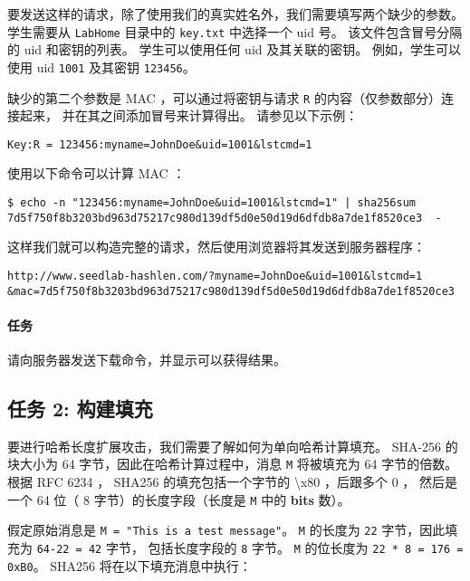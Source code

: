 要发送这样的请求，除了使用我们的真实姓名外，我们需要填写两个缺少的参数。
学生需要从 \texttt{LabHome} 目录中的 \texttt{key.txt} 中选择一个 uid 号。
该文件包含冒号分隔的 uid 和密钥的列表。
学生可以使用任何 uid 及其关联的密钥。
例如，学生可以使用 uid \texttt{1001} 及其密钥 \texttt{123456}。

缺少的第二个参数是 MAC ，可以通过将密钥与请求 \texttt{R} 的内容（仅参数部分）连接起来，
并在其之间添加冒号来计算得出。
请参见以下示例：

\begin{lstlisting}
Key:R = 123456:myname=JohnDoe&uid=1001&lstcmd=1
\end{lstlisting}

使用以下命令可以计算 MAC ：

\begin{lstlisting}
$ echo -n "123456:myname=JohnDoe&uid=1001&lstcmd=1" | sha256sum
7d5f750f8b3203bd963d75217c980d139df5d0e50d19d6dfdb8a7de1f8520ce3  -
\end{lstlisting}

这样我们就可以构造完整的请求，然后使用浏览器将其发送到服务器程序：

\begin{lstlisting}
http://www.seedlab-hashlen.com/?myname=JohnDoe&uid=1001&lstcmd=1
&mac=7d5f750f8b3203bd963d75217c980d139df5d0e50d19d6dfdb8a7de1f8520ce3
\end{lstlisting}

\paragraph{任务}
请向服务器发送下载命令，并显示可以获得结果。


\subsection{任务 2: 构建填充}

要进行哈希长度扩展攻击，我们需要了解如何为单向哈希计算填充。
SHA-256 的块大小为 64 字节，因此在哈希计算过程中，消息 \texttt{M} 将被填充为 64 字节的倍数。
根据 RFC 6234 ， SHA256 的填充包括一个字节的 \textbackslash x80 ，后跟多个 0 ，
然后是一个 64 位（ 8 字节）的长度字段（长度是 \texttt{M} 中的 \textbf{bits} 数）。

假定原始消息是 \texttt{M = "This is a test message"}。
\texttt{M} 的长度为 \texttt{22} 字节，因此填充为 \texttt{64-22 = 42} 字节，
包括长度字段的 \texttt{8} 字节。
\texttt{M} 的位长度为 \texttt{22 * 8 = 176 = 0xB0}。
SHA256 将在以下填充消息中执行：

